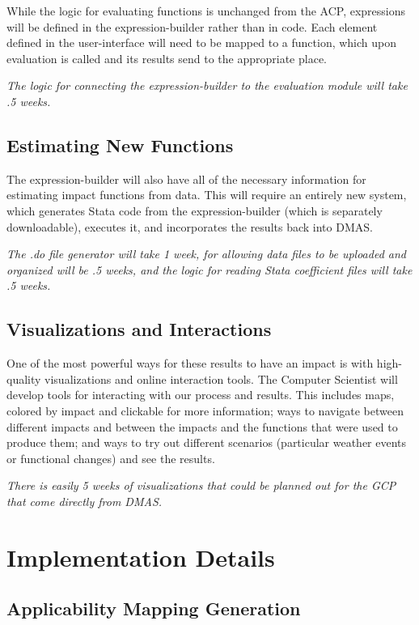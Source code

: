 \documentclass[12pt, oneside]{amsart}
\begin{document}
While the logic for evaluating functions is unchanged from the ACP,
expressions will be defined in the expression-builder rather than in
code.  Each element defined in the user-interface will need to be
mapped to a function, which upon evaluation is called and its results
send to the appropriate place.

{\it The logic for connecting the expression-builder to the evaluation
  module will take .5 weeks.}

\subsection{Estimating New Functions}
\label{sec:estimation}

The expression-builder will also have all of the necessary information
for estimating impact functions from data.  This will require an
entirely new system, which generates Stata code from the
expression-builder (which is separately downloadable), executes it,
and incorporates the results back into DMAS.

{\it The .do file generator will take 1 week, for allowing data files
  to be uploaded and organized will be .5 weeks, and the logic for
  reading Stata coefficient files will take .5 weeks.}

\subsection{Visualizations and Interactions}
\label{sec:visualinteract}

One of the most powerful ways for these results to have an impact is
with high-quality visualizations and online interaction tools.  The
Computer Scientist will develop tools for interacting with our process
and results.  This includes maps, colored by impact and clickable for
more information; ways to navigate between different impacts and
between the impacts and the functions that were used to produce them;
and ways to try out different scenarios (particular weather events or
functional changes) and see the results.

{\it There is easily 5 weeks of visualizations that could be planned
  out for the GCP that come directly from DMAS.}

\section{Implementation Details}

\subsection{Applicability Mapping Generation}
\label{sec:appmapgen}
\end{document}
